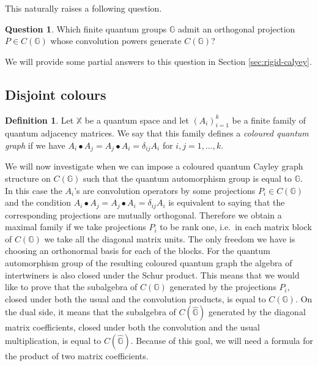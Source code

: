 \documentclass[12pt]{amsart}
\theoremstyle{definition}
\theoremstyle{definition}
\newtheorem{question}[thm]{Question}
\theoremstyle{definition}
\newtheorem{defn}[thm]{Definition}
\theoremstyle{definition}
\newcommand{\G}{\mathbb{G}}
\newcommand{\X}{\mathbb{X}}
\numberwithin{equation}{section}
\begin{document}
This naturally raises a following question.

\begin{question}
   Which finite quantum groups $\G$ admit an orthogonal projection $P \in C(\G)$ whose convolution powers generate $C(\G)$?
\end{question}

We will provide some partial answers to this question in Section \ref{sec:rigid-calyey}.

\subsection{Disjoint colours}\label{subsec:disjoint}
\begin{defn}
Let $\X$ be a quantum space and let $(A_i)_{i=1}^k$ be a finite family of quantum adjacency matrices. We say that this family defines a \emph{coloured quantum graph} if we have $A_i \bullet A_j = A_j\bullet A_i = \delta_{ij} A_i$ for $i,j=1, \ldots, k$.
\end{defn}
We will now investigate when we can impose a coloured quantum Cayley graph structure on $C(\G)$ such that the quantum automorphism group is equal to $\G$. In this case the $A_i$'s are convolution operators by some projections $P_i \in C(\G)$ and the condition $A_i \bullet A_j = A_j\bullet A_i = \delta_{ij} A_i$ is equivalent to saying that the corresponding projections are mutually orthogonal. Therefore we obtain a maximal family if we take projections $P_i$ to be rank one, i.e.\ in each matrix block of $C(\G)$ we take all the diagonal matrix units. The only freedom we have is choosing an orthonormal basis for each of the blocks. For the quantum automorphism group of the resulting coloured quantum graph the algebra of intertwiners is also closed under the Schur product. This means that we would like to prove that the subalgebra of $C(\G)$ generated by the projections $P_i$, closed under both the usual and the convolution products, is equal to $C(\G)$. On the dual side, it means that the subalgebra of $C(\widehat{\G})$ generated by the diagonal matrix coefficients, closed under both the convolution and the usual multiplication, is equal to $C(\widehat{\G})$. Because of this goal, we will need a formula for the product of two matrix coefficients.
\end{document}
